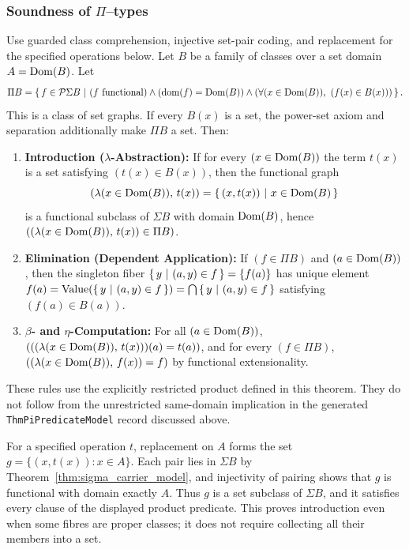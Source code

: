 \subsubsection{Soundness of $\Pi$--types}
\begin{theorem}
\label{thm:pi_carrier_model}
Use guarded class comprehension, injective set-pair coding, and
replacement for the specified operations below. Let $B$ be a family
of classes over a set domain $A=\mathrm{Dom}(B)$. Let
\[
\Pi B = \left\{\,f \in \mathcal{P} \Sigma B\ \middle|\ (f\mathrm{\ functional}) \land (\mathrm{dom}(f) = \mathrm{Dom}(B)) \land (\forall (x \in \mathrm{Dom}(B)),\ (f(x) \in B(x)))\,\right\}.
\]
This is a class of set graphs. If every $B(x)$ is a set, the power-set
axiom and separation additionally make $\Pi B$ a set. Then:
\begin{enumerate}
\item \textbf{Introduction ($\lambda$-Abstraction):} If for every $(x \in \mathrm{Dom}(B))$ the term $t(x)$ is a set satisfying $(t(x) \in B(x))$, then the functional graph
\[
(\lambda (x \in \mathrm{Dom}(B)),\, t(x)) = \left\{\,(x, t(x))\ \middle|\ x \in \mathrm{Dom}(B)\,\right\}
\]
is a functional subclass of $\Sigma B$ with domain $\mathrm{Dom}(B)$, hence $((\lambda (x \in \mathrm{Dom}(B)),\, t(x)) \in \Pi B)$.
\item \textbf{Elimination (Dependent Application):} If $(f \in \Pi B)$ and $(a \in \mathrm{Dom}(B))$, then the singleton fiber $\left\{\,y\ \middle|\ (a, y) \in f\,\right\} = \{f(a)\}$ has unique element $f(a) = \mathrm{Value}(\left\{\,y\ \middle|\ (a, y) \in f\,\right\}) = \bigcap\left\{\,y\ \middle|\ (a, y) \in f\,\right\}$ satisfying $(f(a) \in B(a))$.
\item \textbf{$\beta$- and $\eta$-Computation:} For all $(a \in \mathrm{Dom}(B))$, $(((\lambda (x \in \mathrm{Dom}(B)),\, t(x)))(a) = t(a))$, and for every $(f \in \Pi B)$, $((\lambda (x \in \mathrm{Dom}(B)),\, f(x)) = f)$ by functional extensionality.
\end{enumerate}
These rules use the explicitly restricted product defined in this theorem. They do not follow from the unrestricted same-domain implication in the generated \texttt{ThmPiPredicateModel} record discussed above.
\end{theorem}
\Proof
For a specified operation $t$, replacement on $A$ forms the set
$g=\{(x,t(x)):x\in A\}$. Each pair lies in $\Sigma B$ by
Theorem~\ref{thm:sigma_carrier_model}, and injectivity of pairing
shows that $g$ is functional with domain exactly $A$. Thus $g$ is
a set subclass of $\Sigma B$, and it satisfies every clause of the
displayed product predicate. This proves introduction even when
some fibres are proper classes; it does not require collecting all
their members into a set.

